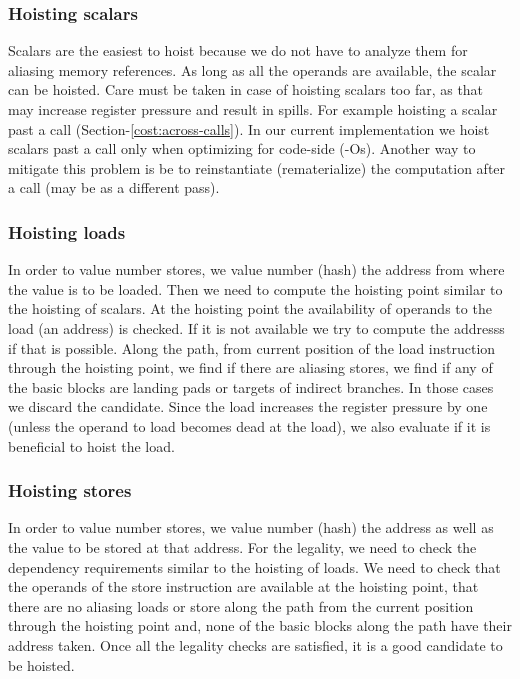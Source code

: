 \documentclass{sig-alternate}
\begin{document}
\subsubsection{Hoisting scalars}
Scalars are the easiest to hoist because we do not have to analyze them for
aliasing memory references. As long as all the operands are available, the
scalar can be hoisted. Care must be taken in case of hoisting scalars too far,
as that may increase register pressure and result in spills. For example
hoisting a scalar past a call (Section-\ref{cost:across-calls}). In our current
implementation we hoist scalars past a call only when optimizing for code-side
(-Os). Another way to mitigate this problem is be to reinstantiate
(rematerialize) the computation after a call (may be as a different pass).

\subsubsection{Hoisting loads}
In order to value number stores, we value number (hash) the address from where
the value is to be loaded. Then we need to compute the hoisting point similar to
the hoisting of scalars. At the hoisting point the availability of operands to the
load (an address) is checked. If it is not available we try to compute the
addresss if that is possible.  Along the path, from current position of the load
instruction through the hoisting point, we find if there are aliasing stores, we
find if any of the basic blocks are landing pads or targets of indirect
branches. In those cases we discard the candidate. Since the load increases the
register pressure by one (unless the operand to load becomes dead at the load),
we also evaluate if it is beneficial to hoist the load.

\subsubsection{Hoisting stores}
In order to value number stores, we value number (hash) the address as well as
the value to be stored at that address. For the legality, we need to check the
dependency requirements similar to the hoisting of loads. We need to check that
the operands of the store instruction are available at the hoisting point, that
there are no aliasing loads or store along the path from the current position
through the hoisting point and, none of the basic blocks along the path have
their address taken. Once all the legality checks are satisfied, it is a good
candidate to be hoisted.
\end{document}
